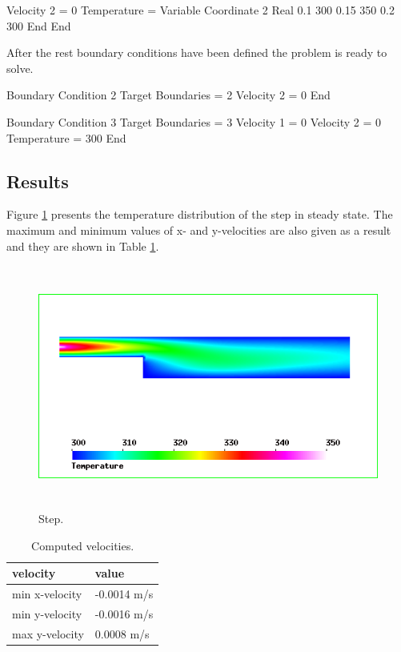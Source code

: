\begin{flushleft}
  Velocity 2 = 0
  Temperature = Variable Coordinate 2
    Real 
      0.1    300
      0.15   350
      0.2    300
    End
End
\ttend

After the rest boundary conditions have been defined the problem is ready to solve.

\ttbegin
Boundary Condition 2
  Target Boundaries = 2
  Velocity 2 = 0
End

Boundary Condition 3
  Target Boundaries = 3
  Velocity 1 = 0
  Velocity 2 = 0
  Temperature = 300
End
\ttend

\subsection*{Results}

Figure \ref{fg:comp_step_temp} presents the temperature distribution of the step in steady state. The maximum and minimum values of x- and y-velocities are also given as a result and they are shown in Table \ref{tb:velocities}.

\begin{figure}[h]
\centering
\includegraphics[height=80mm]{comp_step_temp.png}
\caption{Step.}\label{fg:comp_step_temp}
\end{figure}

\begin{table}[h]
\caption{Computed velocities.}
\label{tb:velocities}
\begin{center}
\begin{tabular}{ll} \hline
velocity  & value \\ \hline
min x-velocity & -0.0014 m/s\\
min y-velocity & -0.0016 m/s        \\
max y-velocity & 0.0008 m/s      \\ \hline
\end{tabular}
\end{center}
\end{table}

\end{flushleft}

\vfill